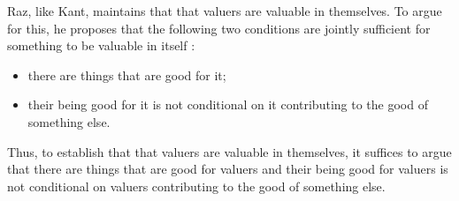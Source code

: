 \documentclass[a4paper,12pt]{article}
\begin{document}
% 
% 
% 
% 

Raz, like Kant, maintains that that valuers are valuable in themselves. To argue for this, he proposes that the following two conditions are jointly sufficient for something to be valuable in itself \citep[151--2]{Raz:2001ps}:
\begin{itemize}
	\item there are things that are good for it;
	\item their being good for it is not conditional on it contributing to the good of something else. 
\end{itemize}
Thus, to establish that that valuers are valuable in themselves, it suffices to argue that there are things that are good for valuers and their being good for valuers is not conditional on valuers contributing to the good of something else. 
\end{document}
